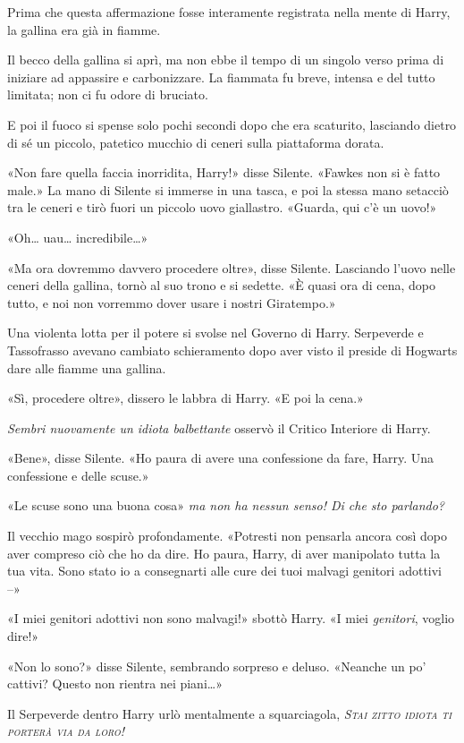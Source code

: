 Prima che questa affermazione fosse interamente registrata nella mente di Harry, la gallina era già in fiamme.

Il becco della gallina si aprì, ma non ebbe il tempo di un singolo verso prima di iniziare ad appassire e carbonizzare. La fiammata fu breve, intensa e del tutto limitata; non ci fu odore di bruciato.

E poi il fuoco si spense solo pochi secondi dopo che era scaturito, lasciando dietro di sé un piccolo, patetico mucchio di ceneri sulla piattaforma dorata.

«Non fare quella faccia inorridita, Harry!» disse Silente. «Fawkes non si è fatto male.» La mano di Silente si immerse in una tasca, e poi la stessa mano setacciò tra le ceneri e tirò fuori un piccolo uovo giallastro. «Guarda, qui c’è un uovo!»

«Oh… uau… incredibile…»

«Ma ora dovremmo davvero procedere oltre», disse Silente. Lasciando l’uovo nelle ceneri della gallina, tornò al suo trono e si sedette. «È quasi ora di cena, dopo tutto, e noi non vorremmo dover usare i nostri Giratempo.»

Una violenta lotta per il potere si svolse nel Governo di Harry. Serpeverde e Tassofrasso avevano cambiato schieramento dopo aver visto il preside di Hogwarts dare alle fiamme una gallina.

«Sì, procedere oltre», dissero le labbra di Harry. «E poi la cena.»

\textit{Sembri nuovamente un idiota balbettante} osservò il Critico Interiore di Harry.

«Bene», disse Silente. «Ho paura di avere una confessione da fare, Harry. Una confessione e delle scuse.»

«Le scuse sono una buona cosa» \textit{ma non ha nessun senso! Di che sto parlando?}

Il vecchio mago sospirò profondamente. «Potresti non pensarla ancora così dopo aver compreso ciò che ho da dire. Ho paura, Harry, di aver manipolato tutta la tua vita. Sono stato io a consegnarti alle cure dei tuoi malvagi genitori adottivi –»

«I miei genitori adottivi non sono malvagi!» sbottò Harry. «I miei \textit{genitori}, voglio dire!»

«Non lo sono?» disse Silente, sembrando sorpreso e deluso. «Neanche un po’ cattivi? Questo non rientra nei piani…»

Il Serpeverde dentro Harry urlò mentalmente a squarciagola, \textsl{\textsc{Stai zitto idiota ti porterà via da loro!}}

